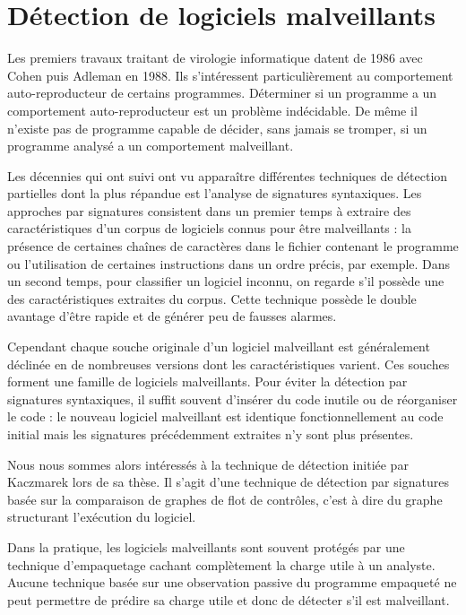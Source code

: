 \section*{Détection de logiciels malveillants}
Les premiers travaux traitant de virologie informatique datent de 1986 avec Cohen \cite{Cohen86} puis Adleman \cite{Adleman88} en 1988. Ils s'intéressent particulièrement au comportement auto-reproducteur de certains programmes. Déterminer si un programme a un comportement auto-reproducteur est un problème indécidable. De même il n'existe pas de programme capable de décider, sans jamais se tromper, si un programme analysé a un comportement malveillant.

Les décennies qui ont suivi ont vu apparaître différentes techniques de détection partielles dont la plus répandue est l'analyse de signatures syntaxiques. Les approches par signatures consistent dans un premier temps à extraire des caractéristiques d'un corpus de logiciels connus pour être malveillants : la présence de certaines chaînes de caractères dans le fichier contenant le programme ou l'utilisation de certaines instructions dans un ordre précis, par exemple. Dans un second temps, pour classifier un logiciel inconnu, on regarde s'il possède une des caractéristiques extraites du corpus.
Cette technique possède le double avantage d'être rapide et de générer peu de fausses alarmes.

Cependant chaque souche originale d'un logiciel malveillant est généralement déclinée en de nombreuses versions dont les caractéristiques varient. Ces souches forment une famille de logiciels malveillants. Pour éviter la détection par signatures syntaxiques, il suffit souvent d'insérer du code inutile ou de réorganiser le code : le nouveau logiciel malveillant est identique fonctionnellement au code initial mais les signatures précédemment extraites n'y sont plus présentes.

Nous nous sommes alors intéressés à la technique de détection initiée par Kaczmarek \cite{BKM08} lors de sa thèse. Il s'agit d'une technique de détection par signatures basée sur la comparaison de graphes de flot de contrôles, c'est à dire du graphe structurant l'exécution du logiciel.

Dans la pratique, les logiciels malveillants sont souvent protégés par une technique d'empaquetage cachant complètement la charge utile à un analyste.
Aucune technique basée sur une observation passive du programme empaqueté ne peut permettre de prédire sa charge utile et donc de détecter s'il est malveillant.

